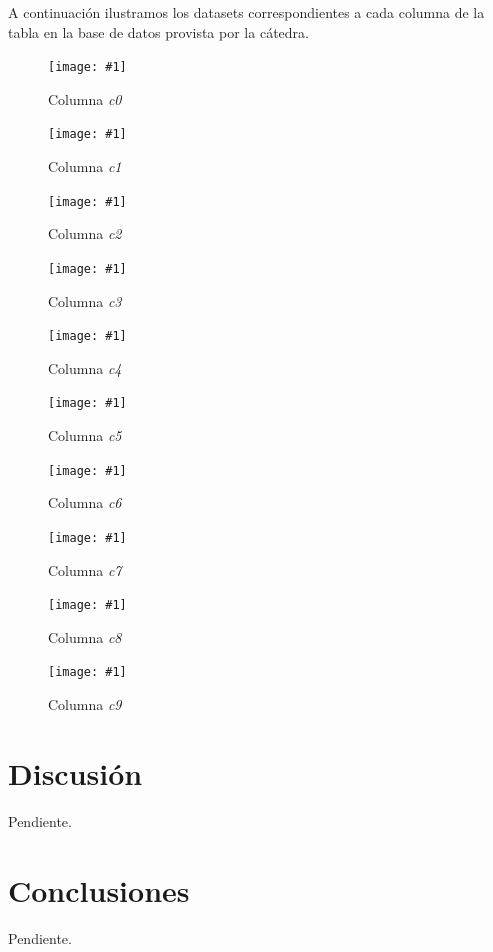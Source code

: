 \documentclass[a4paper, 10pt, twoside]{article}
\newcommand{\grafico}[3]{
  \begin{figure}[H]
    \texttt{[image: \#1]}
    \caption{#2}
    \label{#3}
  \end{figure}
}
\begin{document}
A continuación ilustramos los datasets correspondientes a cada columna de la tabla en la base de datos provista por la cátedra.

\grafico{dataset-c0}
        {Columna \emph{c0}}
        {dataset-columna-c0}

\grafico{dataset-c1}
        {Columna \emph{c1}}
        {dataset-columna-c1}

\grafico{dataset-c2}
        {Columna \emph{c2}}
        {dataset-columna-c2}

\grafico{dataset-c3}
        {Columna \emph{c3}}
        {dataset-columna-c3}

\grafico{dataset-c4}
        {Columna \emph{c4}}
        {dataset-columna-c4}

\grafico{dataset-c5}
        {Columna \emph{c5}}
        {dataset-columna-c5}

\grafico{dataset-c6}
        {Columna \emph{c6}}
        {dataset-columna-c6}

\grafico{dataset-c7}
        {Columna \emph{c7}}
        {dataset-columna-c7}

\grafico{dataset-c8}
        {Columna \emph{c8}}
        {dataset-columna-c8}

\grafico{dataset-c9}
        {Columna \emph{c9}}
        {dataset-columna-c9}




\section{Discusión}

Pendiente.




\section{Conclusiones}

Pendiente.
\end{document}
